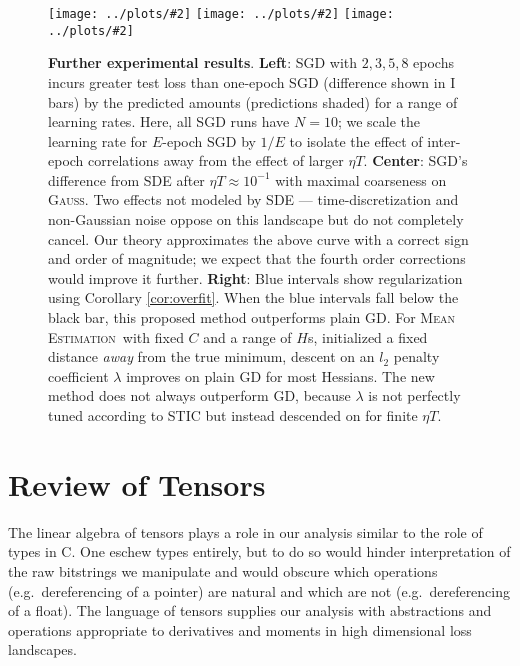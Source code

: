 \documentclass[anon,12pt]{colt2021} %
\newcommand{\pmoo}[2]{\texttt{[image: ../plots/\#2]}}
\newcommand{\Gauss}{\textsc{Gauss}}
\newcommand{\MeanEstimation}{\textsc{Mean Estimation}}
\begin{document}
{        \begin{figure}[h] 
            \centering
            \centering
            \pmoo{3.5cm}{multi-fashion-logistic-0}
            \pmoo{3.5cm}{vs-sde}
            \pmoo{3.5cm}{tak-reg}
            \caption{
                \textbf{Further experimental results}.
                \textbf{Left}: SGD with $2, 3, 5, 8$ epochs incurs greater test
                loss than one-epoch SGD (difference shown in I bars) by the
                predicted amounts (predictions shaded) for a range of learning
                rates.  Here, all SGD runs have $N=10$; we scale the learning
                rate for $E$-epoch SGD by $1/E$ to isolate the effect of
                inter-epoch correlations away from the effect of larger $\eta
                T$.
                \textbf{Center}: SGD's difference from SDE after $\eta T
                \approx 10^{-1}$ with maximal coarseness on \Gauss.  Two
                effects not modeled by SDE --- time-discretization and
                non-Gaussian noise oppose on this landscape but do not
                completely cancel.  Our theory approximates the above curve
                with a correct sign and order of magnitude; we expect that the
                fourth order corrections would improve it further.
                \textbf{Right}: Blue intervals show regularization using Corollary
                \ref{cor:overfit}.  When the blue intervals fall below the
                black bar, this proposed method outperforms plain GD.  For
                \MeanEstimation\ with fixed $C$ and a range of $H$s, initialized
                a fixed distance \emph{away} from the true minimum, descent on
                an $l_2$ penalty coefficient $\lambda$ improves on plain GD for
                most Hessians.  The new method does not always outperform GD,
                because $\lambda$ is not perfectly tuned according to STIC but
                instead descended on for finite $\eta T$.
            }
            \label{fig:takreg}
        \end{figure}

    \section{Review of Tensors}

        The linear algebra of tensors plays a role in our analysis similar to
        the role of types in C.  One eschew types entirely, but to
        do so would hinder interpretation of the raw bitstrings we manipulate
        and would obscure which operations (e.g.\ dereferencing of a pointer)
        are natural and which are not (e.g.\ dereferencing of a float). 
        The language of tensors supplies our analysis with
        abstractions and operations appropriate to derivatives and
        moments in high dimensional loss landscapes.

}
\end{document}
